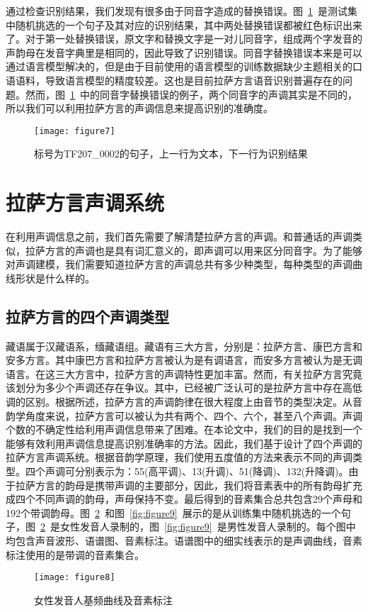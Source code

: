 通过检查识别结果，我们发现有很多由于同音字造成的替换错误。图~\ref{fig:figure7}~是测试集中随机挑选的一个句子及其对应的识别结果，其中两处替换错误都被红色标识出来了。对于第一处替换错误，原文字和替换文字是一对儿同音字，组成两个字发音的声韵母在发音字典里是相同的，因此导致了识别错误。同音字替换错误本来是可以通过语言模型解决的，但是由于目前使用的语言模型的训练数据缺少主题相关的口语语料，导致语言模型的精度较差。这也是目前拉萨方言语音识别普遍存在的问题。然而，图~\ref{fig:figure7}~中的同音字替换错误的例子，两个同音字的声调其实是不同的，所以我们可以利用拉萨方言的声调信息来提高识别的准确度。
\begin{figure}[htbp]
\centering
\texttt{[image: figure7]}
\caption{标号为TF207\_0002的句子，上一行为文本，下一行为识别结果}\label{fig:figure7}
\vspace{\baselineskip}
\end{figure}

\section{拉萨方言声调系统}
在利用声调信息之前，我们首先需要了解清楚拉萨方言的声调。和普通话的声调类似，拉萨方言的声调也是具有词汇意义的，即声调可以用来区分同音字。为了能够对声调建模，我们需要知道拉萨方言的声调总共有多少种类型，每种类型的声调曲线形状是什么样的。
\subsection{拉萨方言的四个声调类型}
藏语属于汉藏语系，缅藏语组。藏语有三大方言，分别是：拉萨方言、康巴方言和安多方言。其中康巴方言和拉萨方言被认为是有调语言，而安多方言被认为是无调语言。在这三大方言中，拉萨方言的声调特性更加丰富。然而，有关拉萨方言究竟该划分为多少个声调还存在争议。其中，已经被广泛认可的是拉萨方言中存在高低调的区别。根据\cite{hu2010lhasa}所述，拉萨方言的声调韵律在很大程度上由音节的类型决定。从音韵学角度来说，拉萨方言可以被认为共有两个、四个、六个，甚至八个声调。声调个数的不确定性给利用声调信息带来了困难。在本论文中，我们的目的是找到一个能够有效利用声调信息提高识别准确率的方法。因此，我们基于\cite{Yudaoquan}设计了四个声调的拉萨方言声调系统。根据音韵学原理，我们使用五度值的方法\cite{chao1980system}来表示不同的声调类型。四个声调可分别表示为：55(高平调)、13(升调)、51(降调)、132(升降调)。由于拉萨方言的韵母是携带声调的主要部分，因此，我们将音素表中的所有韵母扩充成四个不同声调的韵母，声母保持不变。最后得到的音素集合总共包含29个声母和192个带调韵母。图~\ref{fig:figure8}~和图~\ref{fig:figure9}~展示的是从训练集中随机挑选的一个句子，图~\ref{fig:figure8}~是女性发音人录制的，图~\ref{fig:figure9}~是男性发音人录制的。每个图中均包含声音波形、语谱图、音素标注。语谱图中的细实线表示的是声调曲线，音素标注使用的是带调的音素集合。
\begin{figure}[htbp]
\centering
\texttt{[image: figure8]}
\caption{女性发音人基频曲线及音素标注}\label{fig:figure8}
\vspace{\baselineskip}
\end{figure}

